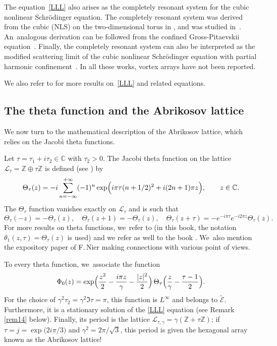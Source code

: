 \documentclass[10pt]{amsart}
\theoremstyle{definition}
\let\EE\exp
\newcommand\C{\mathbb C}
\begin{document}
The equation~\eqref{LLL} also arises as the completely resonant system for the cubic nonlinear Schrödinger equation. The completely resonant system was derived from the cubic (NLS) on the two-dimensional torus in \cite{FGH}, and was studied in~\cite{GHT, GHT2}. An~analogous derivation can be followed from the confined Gross-Pitaevskii equation~\cite{MeSpa,FMS}. Finally, the completely resonant system can also be interpreted as the modified scattering limit of the cubic nonlinear Schrödinger equation with partial harmonic confinement~\cite{H-T}. In all these works, vortex arrays have not been reported.

We also refer to \cite{GT, BiBiCrEv, BiBiEv, Clerck-Evnin, Sch} for more results on~\eqref{LLL} and related equations.

\subsection{The theta function and the Abrikosov lattice} We now turn to the mathematical description of the Abrikosov lattice, which relies on the Jacobi theta functions.

Let $\tau=\tau_1+i \tau_2 \in \C$ with $\tau_2>0$. The Jacobi theta function on the lattice $ \mathcal{L}_\tau = \mathbb{Z}\oplus \tau \mathbb{Z}$ is defined (see \cite[Chap.\,V]{Cha}) by
\begin{equation*}
\Theta_{\tau}(z)=-i \sum_{n=-\infty}^{+\infty} (-1)^n \EE\Bigl({i\pi \tau (n+1/2)^2}+{i(2n+1)\pi z}\Bigr), \qquad z\in \C.
\end{equation*}
The $\Theta_{\tau}$ function vanishes exactly on $\mathcal{L}_\tau$ and is such that
\begin{equation}\label{star}
\Theta_{\tau}(-z)=-\Theta_{\tau}(z),\quad \Theta_{\tau}(z+1)=-\Theta_{\tau}(z),\quad \Theta_{\tau}(z+\tau)=-e^{-i \pi \tau}e^{-i 2\pi z}\Theta_{\tau}(z).
\end{equation}
For more results on theta functions, we~refer to \cite[\S 4]{Godement} (in this book, the notation $\theta_1(z, \tau)=\Theta_{\tau}(z)$ is used) and we refer as well to the book \cite{Mumford}. We~also mention the expository paper \cite{Nier2} of F.\,Nier making connections with various point of views.

To every theta function, we~associate the function
\[
\Phi_0(z) = \EE\Bigl(\frac{z^2}2 - \frac{{i \pi}z} {\gamma} - \frac{|z|^2}2\Bigr) \,\Theta_\tau \Bigl(\frac{z}{\gamma} - \frac{\tau-1}{2} \Bigr).
\]
For the choice of $\gamma^2 \tau_2 = \gamma^2 \Im \tau= \pi$, this function is $L^\infty$ and belongs to $\widetilde {\mathcal E}$. Furthermore, it is a stationary solution of the \eqref{LLL} equation (see Remark \ref{rem14} below). Finally, its period is the lattice $\mathcal{L}_{\tau,\gamma}=\gamma (\mathbb{Z} + \tau \mathbb{Z})$;
if $\tau = j = \EE\bigl({{2i \pi}/{3}}\bigr)$ and $\gamma^2 = {2\pi}/{\sqrt{3}}$, this period is given the hexagonal array known as the Abrikosov lattice!
\end{document}
